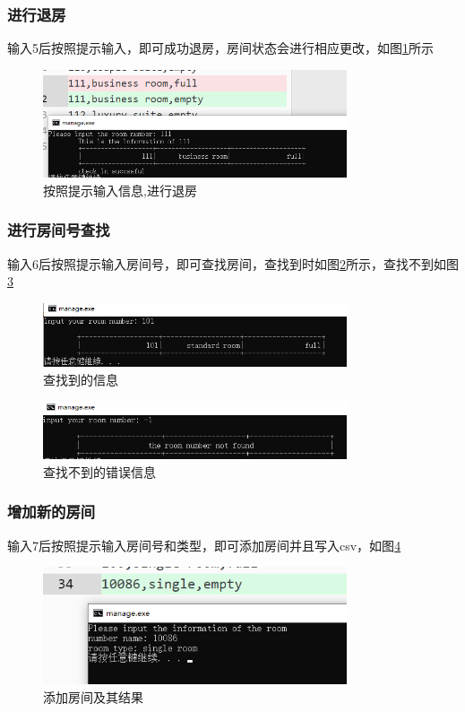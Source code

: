 \documentclass[UTF8]{ctexart}
\begin{document}
    \subsubsection{进行退房}
      输入5后按照提示输入，即可成功退房，房间状态会进行相应更改，如图\ref{fig:5_1}所示
      \begin{figure}[H]
        \centering
        \includegraphics[width=0.8\textwidth]{5_1}
        \caption{按照提示输入信息,进行退房}
        \label{fig:5_1}
      \end{figure}

    \subsubsection{进行房间号查找}
      输入6后按照提示输入房间号，即可查找房间，查找到时如图\ref{fig:6_1}所示，查找不到如图\ref{fig:6_2}
      \begin{figure}[H]
        \centering
        \includegraphics[width=0.8\textwidth]{6_1}
        \caption{查找到的信息}
        \label{fig:6_1}
      \end{figure}
      \begin{figure}[H]
        \centering
        \includegraphics[width=0.8\textwidth]{6_2}
        \caption{查找不到的错误信息}
        \label{fig:6_2}
      \end{figure}

    \subsubsection{增加新的房间}
      输入7后按照提示输入房间号和类型，即可添加房间并且写入csv，如图\ref{fig:7}
      \begin{figure}[H]
        \centering
        \includegraphics[width=0.8\textwidth]{7}
        \caption{添加房间及其结果}
        \label{fig:7}
      \end{figure}
\end{document}
